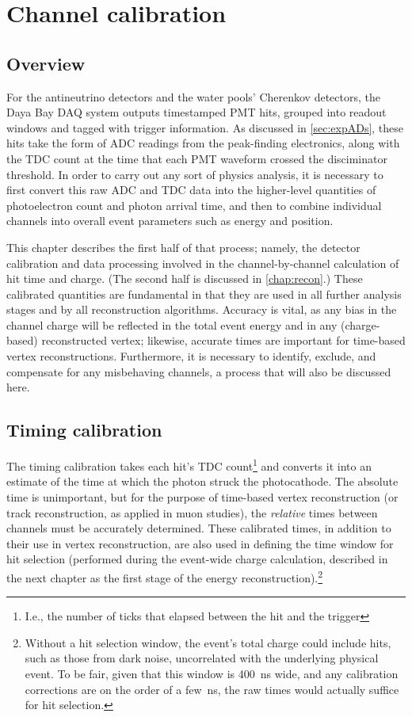 \documentclass[../thesis.tex]{subfiles}
\begin{document}
\chapter{Channel calibration}
\label{chap:calib}

\section{Overview}

For the antineutrino detectors and the water pools' Cherenkov detectors, the Daya Bay DAQ system outputs timestamped PMT hits, grouped into readout windows and tagged with trigger information. As discussed in \autoref{sec:expADs}, these hits take the form of ADC readings from the peak-finding electronics, along with the TDC count at the time that each PMT waveform crossed the disciminator threshold. In order to carry out any sort of physics analysis, it is necessary to first convert this raw ADC and TDC data into the higher-level quantities of photoelectron count and photon arrival time, and then to combine individual channels into overall event parameters such as energy and position.

This chapter describes the first half of that process; namely, the detector calibration and data processing involved in the channel-by-channel calculation of hit time and charge. (The second half is discussed in \autoref{chap:recon}.) These calibrated quantities are fundamental in that they are used in all further analysis stages and by all reconstruction algorithms. Accuracy is vital, as any bias in the channel charge will be reflected in the total event energy and in any (charge-based) reconstructed vertex; likewise, accurate times are important for time-based vertex reconstructions. Furthermore, it is necessary to identify, exclude, and compensate for any misbehaving channels, a process that will also be discussed here.

\section{Timing calibration}
\label{sec:calibTiming}

The timing calibration takes each hit's TDC count\footnote{I.e., the number of ticks that elapsed between the hit and the trigger} and converts it into an estimate of the time at which the photon struck the photocathode. The absolute time is unimportant, but for the purpose of time-based vertex reconstruction (or track reconstruction, as applied in muon studies), the \emph{relative} times between channels must be accurately determined. These calibrated times, in addition to their use in vertex reconstruction, are also used in defining the time window for hit selection (performed during the event-wide charge calculation, described in the next chapter as the first stage of the energy reconstruction).\footnote{Without a hit selection window, the event's total charge could include hits, such as those from dark noise, uncorrelated with the underlying physical event. To be fair, given that this window is 400~ns wide, and any calibration corrections are on the order of a few~ns, the raw times would actually suffice for hit selection.}
\end{document}
